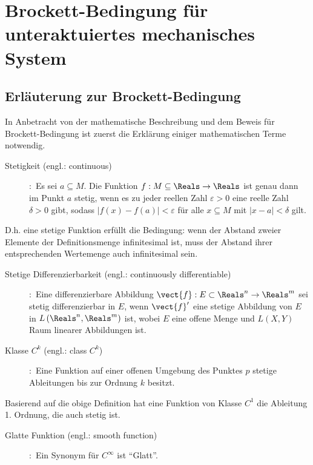 \chapter{Brockett-Bedingung für unteraktuiertes mechanisches System}
\label{Brockett_Bedingung_für_unteraktuiertes_mechanisches_System}
\section{Erläuterung zur Brockett-Bedingung}
\label{Erläuterung zur Brockett-Bedingung}
In Anbetracht von der mathematische Beschreibung und dem Beweis für Brockett-Bedingung ist zuerst die Erklärung einiger mathematischen Terme notwendig.    
\begin{description} 
	\item[Stetigkeit (engl.: continuous)]
	\cite[S.250]{grosche2003teubner}:~Es sei $a\subseteq M$. Die Funktion $f:M\subseteq\Reals\to\Reals$ ist genau dann im Punkt $a$ stetig, wenn es zu jeder reellen Zahl $\varepsilon>0$ eine reelle Zahl $\delta>0$ gibt, sodass
	$\left | f\left ( x \right )-f\left ( a \right ) \right |< \varepsilon$ für alle $x\subseteq M$ mit $\left | x-a \right |< \delta $ gilt.  
\end{description}
\vspace{-0.8em}
D.h. eine stetige Funktion erfüllt die Bedingung: wenn der Abstand zweier Elemente der Definitionsmenge infinitesimal ist, muss der Abstand ihrer entsprechenden Wertemenge auch infinitesimal sein.
\begin{description}
	\item[Stetige Differenzierbarkeit (engl.: continuously differentiable)]
	\cite[S.256]{rudin2009analysis}:~Eine differenzierbare Abbildung $\vect{f}:E\subset\Reals^{n}\to \Reals^{m}$ sei stetig differenzierbar in $E$, wenn ${\vect{f}}'$ eine stetige Abbildung von $E$ in $L\left ( \Reals^{n},\Reals^{m} \right )$ ist, wobei $E$ eine offene Menge und $L\left ( X,Y \right )$ Raum linearer Abbildungen ist.
	\item[Klasse $C^{k}$ (engl.: class $C^{k}$)]
	\cite[S.265]{grosche2003teubner}:~Eine Funktion auf einer offenen Umgebung des Punktes $p$ stetige Ableitungen bis zur Ordnung $k$ besitzt.
\end{description}
\vspace{-0.8em}
Basierend auf die obige Definition hat eine Funktion von Klasse $C^{1}$ die Ableitung 1. Ordnung, die auch stetig ist.
\begin{description}
	\item[Glatte Funktion (engl.: smooth function)]
	\cite[S.5]{tu2010introduction}:~Ein Synonym für $C^{\infty}$ ist ``Glatt''.
\end{description}
